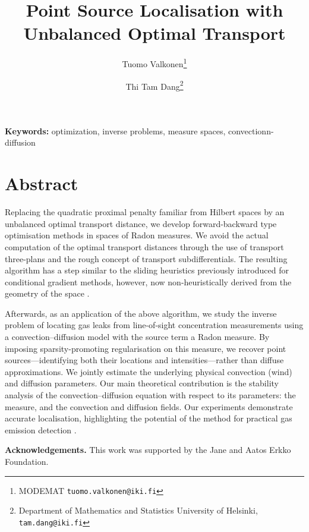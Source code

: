 \documentclass[11pt]{article}
\title{\bfseries Point Source Localisation with Unbalanced Optimal Transport}
\author{
Tuomo Valkonen\thanks{MODEMAT
\texttt{tuomo.valkonen@iki.fi}}
\and
Thi Tam Dang\thanks{Department of Mathematics and Statistics University of Helsinki,
\texttt{tam.dang@iki.fi}}
}
\date{}
\begin{document}
\maketitle

\vspace{-1em}

\noindent
\textbf{Keywords:}
optimization, inverse problems, measure spaces, convectionn-diffusion

\vspace{0.5em}


\vspace{1em}

\section*{Abstract}

Replacing the quadratic proximal penalty familiar from Hilbert spaces by an unbalanced optimal transport distance, we develop forward-backward type optimisation methods in spaces of Radon measures. We avoid the actual computation of the optimal transport distances through the use of transport three-plans and the rough concept of transport subdifferentials. The resulting algorithm has a step similar to the sliding heuristics previously introduced for conditional gradient methods, however, now non-heuristically derived from the geometry of the space \cite{tuomov-unbalanced}.

Afterwards, as an application of the above algorithm, we study the inverse problem of locating gas leaks from line-of-sight concentration measurements using a convection–diffusion model with the source term a Radon measure. By imposing sparsity-promoting regularisation on this measure, we recover point sources---identifying both their locations and intensities---rather than diffuse approximations.
We jointly estimate the underlying physical convection (wind) and diffusion parameters.
Our main theoretical contribution is the stability analysis of the convection--diffusion equation with respect to its parameters: the measure, and the convection and diffusion fields.
Our experiments demonstrate accurate localisation, highlighting the potential of the method for practical gas emission detection \cite{dangvalkonen2026leak}.


\vspace{1em}

\noindent
\textbf{Acknowledgements.}
This work was supported by the Jane and Aatos Erkko Foundation.
\end{document}
